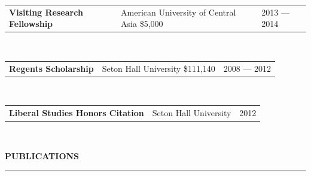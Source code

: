 \documentclass{cv} %
\begin{document}
\begin{minipage}{\textwidth}



\begin{tabular}{@{}p{}p{}@{}p{}@{}}
{\bf Visiting Research Fellowship}
  &
{\footnotesize American University of Central Asia \hfill \$5,000\hspace{0.5cm}}
&
\hfill {2013 --- 2014}
\end{tabular}
\\


\begin{tabular}{@{}p{}p{}@{}p{}@{}}
{\bf Regents Scholarship}
  &
 {\footnotesize Seton Hall University \hfill \${111,140}\hspace{0.5cm}}
  &
 \hfill {2008 --- 2012}
\end{tabular}
\\


\begin{tabular}{@{}p{}p{}@{}p{}@{}}
{\bf Liberal Studies Honors Citation}
  &
 {\footnotesize Seton Hall University} \hfill
  &
 \hfill {2012}
\end{tabular}
\\

\end{minipage}


\newpage

\vspace{.5cm}
\sectionskip
\MakeUppercase{\textbf{Publications}}
  \sectionlineskip
  \hrule
\vspace{.5cm}
\end{document}
